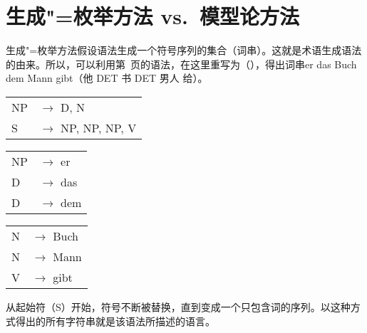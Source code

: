 
\chapter{生成"=枚举方法 vs.\ 模型论方法}
\label{Abschnitt-Generativ-Modelltheoretisch}

生成"=枚举方法假设语法生成一个符号序列的集合（词串）。这就是术语生成语法 的由来。所以，可以利用第~\pageref{bsp-grammatik-psg}页的语法，在这里重写为（），得出词串er das Buch dem Mann gibt（他 DET 书 DET 男人 给）。
\ea
\label{bsp-grammatik-psg-zwei}
\begin{tabular}[t]{@{}l@{ }l}
{NP} & {$\to$ D, N}\\          
{S}  & {$\to$ NP, NP, NP, V}
\end{tabular}\hspace{2cm}%
\begin{tabular}[t]{@{}l@{ }l}
{NP} & {$\to$ er}\\
{D}  & {$\to$ das}\\
{D}  & {$\to$ dem}\\
\end{tabular}\hspace{8mm}
\begin{tabular}[t]{@{}l@{ }l}
{N} & {$\to$ Buch}\\
{N} & {$\to$ Mann}\\
{V} & {$\to$ gibt}\\
\end{tabular}
\z
从起始符（S）开始，符号不断被替换，直到变成一个只包含词的序列。以这种方式得出的所有字符串就是该语法所描述的语言。

